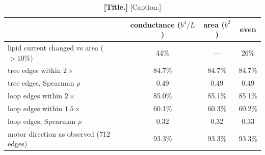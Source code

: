 \begin{table}
\centering
\begin{tabular}{lccc}
\toprule
 & conductance ($b^4/L$) & area ($b^2$) & even \\
\midrule
lipid current changed vs area ($>10\%$) & 44\% & --- & 26\% \\
tree edges within $2\times$ & 84.7\% & 84.7\% & 84.7\% \\
tree edges, Spearman $\rho$ & 0.49 & 0.49 & 0.49 \\
loop edges within $2\times$ & 85.0\% & 85.1\% & 85.1\% \\
loop edges within $1.5\times$ & 60.1\% & 60.3\% & 60.2\% \\
loop edges, Spearman $\rho$ & 0.32 & 0.32 & 0.33 \\
motor direction as observed (712 edges) & 93.3\% & 93.3\% & 93.3\% \\
\bottomrule
\end{tabular}
\caption{\textbf{[Title.]} [Caption.]}\label{tab:si_demand_split}
\end{table}

